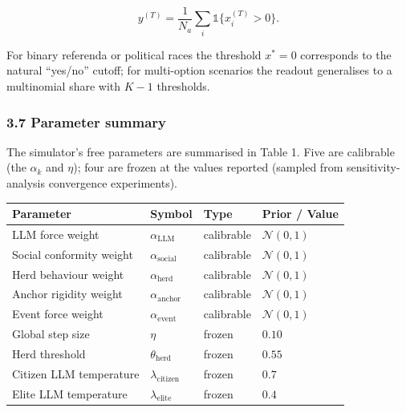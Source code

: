 \documentclass[
]{article}
\begin{document}
\[
y^{(T)} = \frac{1}{N_a} \sum_i \mathbb{1}\{ x_i^{(T)} > 0 \}.
\]

For binary referenda or political races the threshold \(x^* = 0\)
corresponds to the natural ``yes/no'' cutoff; for multi-option scenarios
the readout generalises to a multinomial share with \(K-1\) thresholds.

\subsubsection{3.7 Parameter summary}\label{parameter-summary}

The simulator's free parameters are summarised in Table 1. Five are
calibrable (the \(\alpha_k\) and \(\eta\)); four are frozen at the
values reported (sampled from sensitivity-analysis convergence
experiments).

\begin{longtable}[]{@{}
  >{\raggedright\arraybackslash}p{}
  >{\raggedright\arraybackslash}p{}
  >{\raggedright\arraybackslash}p{}
  >{\raggedright\arraybackslash}p{}@{}}
\toprule\noalign{}
\begin{minipage}[b]{\linewidth}\raggedright
Parameter
\end{minipage} & \begin{minipage}[b]{\linewidth}\raggedright
Symbol
\end{minipage} & \begin{minipage}[b]{\linewidth}\raggedright
Type
\end{minipage} & \begin{minipage}[b]{\linewidth}\raggedright
Prior / Value
\end{minipage} \\
\midrule\noalign{}
\endhead
\bottomrule\noalign{}
\endlastfoot
LLM force weight & \(\alpha_{\text{LLM}}\) & calibrable &
\(\mathcal{N}(0, 1)\) \\
Social conformity weight & \(\alpha_{\text{social}}\) & calibrable &
\(\mathcal{N}(0, 1)\) \\
Herd behaviour weight & \(\alpha_{\text{herd}}\) & calibrable &
\(\mathcal{N}(0, 1)\) \\
Anchor rigidity weight & \(\alpha_{\text{anchor}}\) & calibrable &
\(\mathcal{N}(0, 1)\) \\
Event force weight & \(\alpha_{\text{event}}\) & calibrable &
\(\mathcal{N}(0, 1)\) \\
Global step size & \(\eta\) & frozen & \(0.10\) \\
Herd threshold & \(\theta_{\text{herd}}\) & frozen & \(0.55\) \\
Citizen LLM temperature & \(\lambda_{\text{citizen}}\) & frozen &
\(0.7\) \\
Elite LLM temperature & \(\lambda_{\text{elite}}\) & frozen & \(0.4\) \\
\end{longtable}
\end{document}

